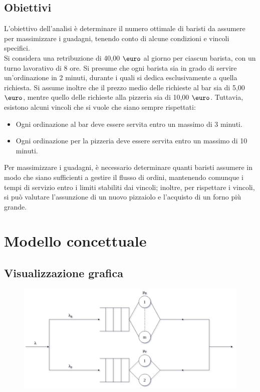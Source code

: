 \documentclass[a4paper, 12pt]{article}
\begin{document}
\bigskip

\subsection{Obiettivi}
L'obiettivo dell'analisi è determinare il numero ottimale di baristi da assumere per massimizzare i guadagni, tenendo conto di alcune condizioni e vincoli specifici.\\

Si considera una retribuzione di 40,00 $\mbox{\euro}$ al giorno per ciascun barista, con un turno lavorativo di 8 ore. Si presume che ogni barista sia in grado di servire un'ordinazione in 2 minuti, durante i quali si dedica esclusivamente a quella richiesta. Si assume inoltre che il prezzo medio delle richieste al bar sia di 5,00 $\mbox{\euro}$, mentre quello delle richieste alla pizzeria sia di 10,00 $\mbox{\euro}$. Tuttavia, esistono alcuni vincoli che si vuole che siano sempre rispettati:
\begin{itemize}
\item Ogni ordinazione al bar deve essere servita entro un massimo di 3 minuti.
\item Ogni ordinazione per la pizzeria deve essere servita entro un massimo di 10 minuti.
\end{itemize}

Per massimizzare i guadagni, è necessario determinare quanti baristi assumere in modo che siano sufficienti a gestire il flusso di ordini, mantenendo comunque i tempi di servizio entro i limiti stabiliti dai vincoli; inoltre, per rispettare i vincoli, si può valutare l'assunzione di un nuovo pizzaiolo e l'acquisto di un forno più grande.

\section{Modello concettuale}
\subsection{Visualizzazione grafica}
\begin{figure}[H]
\centering
\includegraphics[width=\textwidth]{conceptual_model}
\end{figure}
\end{document}
